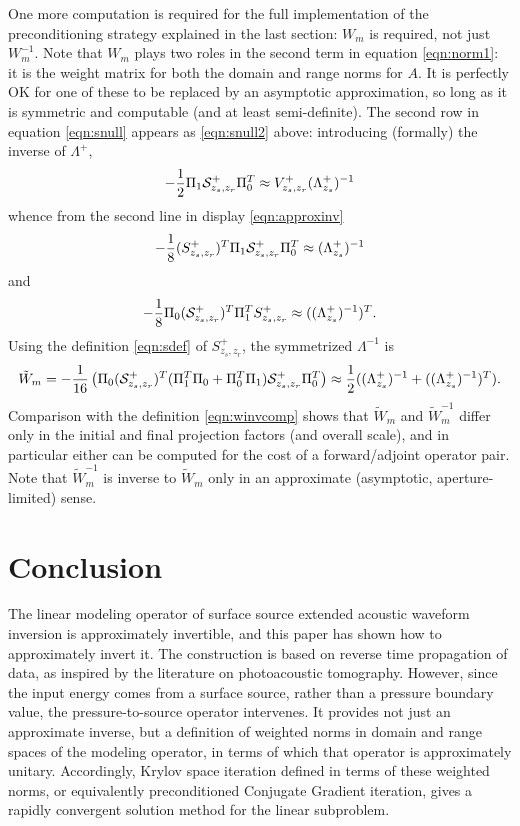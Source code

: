 \documentclass[georeport,12pt]{geophysics}
\begin{document}
One more computation is required for the full implementation of the
preconditioning strategy explained in the last section: $W_m$ is
required, not just $W_m^{-1}$. Note that $W_m$ plays two roles in the
second term in equation \ref{eqn:norm1}: it is the weight matrix for
both the domain and range norms for $A$. It is perfectly OK for one of
these to be replaced by an asymptotic approximation, so long as it is
symmetric and computable (and at least semi-definite). The second row
in equation \ref{eqn:snull} appears as \ref{eqn:snull2} above:
introducing (formally) the inverse of $\Lambda^+$,
\begin{equation}
  \label{eqn:snull2mod}
-\frac{1}{2}\Pi_1{\cal S}^{+}_{z_s,z_r}\Pi_0^T  \approx
V^{+}_{z_s,z_r}(\Lambda^{+}_{z_s})^{-1}
\end{equation}
whence from the second line in display \ref{eqn:approxinv}
\begin{equation}
  \label{eqn:laminv}
-\frac{1}{8}(S^+_{z_s,z_r})^T\Pi_1{\cal S}^{+}_{z_s,z_r}\Pi_0^T  
\approx (\Lambda^{+}_{z_s})^{-1}
\end{equation} 
and
\begin{equation}
  \label{eqn:laminvtr}
-\frac{1}{8}\Pi_0({\cal S}^{+}_{z_s,z_r})^T\Pi_1^T S^+_{z_s,z_r}
\approx ((\Lambda^{+}_{z_s})^{-1})^T.
\end{equation}
Using the definition \ref{eqn:sdef} of $S^+_{z_s,z_r}$, the
symmetrized $\Lambda^{-1}$ is
\begin{equation}
  \label{wcomp}
 \tilde{W}_m = -\frac{1}{16}\left(\Pi_0 ({\cal S}^{+}_{z_s,z_r})^T
   (\Pi_1^T \Pi_0 + \Pi_0^T \Pi_1) {\cal S}^{+}_{z_s,z_r} \Pi_0^T\right)
   \approx \frac{1}{2}((\Lambda^{+}_{z_s})^{-1}
   +((\Lambda^{+}_{z_s})^{-1})^T) .
\end{equation}
Comparison with the definition \ref{eqn:winvcomp} shows that
$\tilde{W}_m$ and $\tilde{W}_m^{-1}$ differ only in the initial and
final projection factors (and overall scale), and in particular either
can be computed for the cost of a forward/adjoint operator pair. Note
that $\tilde{W}_m^{-1}$ is inverse to $\tilde{W}_m$ only in an
approximate (asymptotic, aperture-limited) sense.


\section{Conclusion}

The linear modeling operator of surface source extended acoustic
waveform inversion is approximately invertible, and this paper has
shown how to approximately invert it. The construction is based on
reverse time propagation of data, as inspired by the literature on
photoacoustic tomography. However, since the input energy comes from a
surface source, rather than a pressure boundary value, the
pressure-to-source operator intervenes. It provides not just an
approximate inverse, but a definition of weighted norms in domain and
range spaces of the modeling operator, in terms of which that operator
is approximately unitary. Accordingly, Krylov space iteration defined
in terms of these weighted norms, or equivalently preconditioned
Conjugate Gradient iteration, gives a rapidly convergent solution
method for the linear subproblem.
\end{document}
